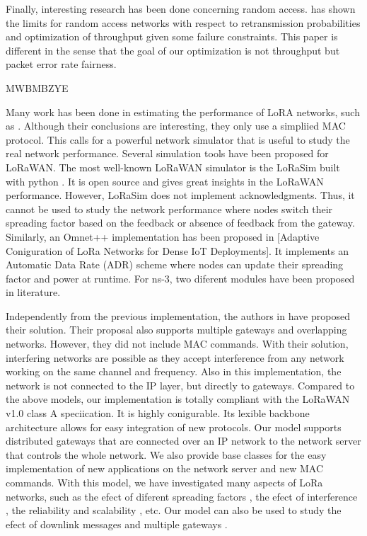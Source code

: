 Finally,
	interesting research has been done concerning random access.
\cite{dhillon_fundamentals_2014} has shown the limits for random access networks with respect to retransmission probabilities and optimization of throughput given some failure constraints.
This paper is different in the sense that the goal of our optimization is not throughput but packet error rate fairness.

\cite{reynders_lorawan_2018} MWBMBZYE


Many work has been done in estimating the performance of LoRA networks,
	such as \cite{adelantado_understanding_2017} \cite{augustin_study_2016} \cite{mikhaylov_analysis_2016}.
Although their conclusions are interesting,
	they only use a simpliied MAC protocol.
This calls for a powerful network simulator that is useful to study the real network performance.
Several simulation tools have been proposed for LoRaWAN.
The most well-known LoRaWAN simulator is the LoRaSim built with python \cite{bor_lora_2016} \cite{voigt_mitigating_2016}.
It is open source and gives great insights in the LoRaWAN performance.
However,
	LoRaSim does not implement acknowledgments.
Thus,
	it cannot be used to study the network performance where nodes switch their spreading factor based on the feedback or absence of feedback from the gateway.
Similarly,
	an Omnet++ implementation has been proposed in [Adaptive Coniguration of LoRa Networks for Dense IoT Deployments].
It implements an Automatic Data Rate (ADR) scheme where nodes can update their spreading factor and power at runtime.
For ns-3,
	two diferent modules have been proposed in literature.


Independently from the previous implementation,
	the authors in \cite{abeele_scalability_2017} have proposed their solution.
Their proposal also supports multiple gateways and overlapping networks.
However,
	they did not include MAC commands.
With their solution,
	interfering networks are possible as they accept interference from any network working on the same channel and frequency.
Also in this implementation,
	the network is not connected to the IP layer,
	but directly to gateways.
Compared to the above models,
	our implementation is totally compliant with the LoRaWAN v1.0 class A speciication.
It is highly conigurable.
Its lexible backbone architecture allows for easy integration of new protocols.
Our model supports distributed gateways that are connected over an IP network to the network server that controls the whole network.
We also provide base classes for the easy implementation of new applications on the network server and new MAC commands.
With this model,
	we have investigated many aspects of LoRa networks,
	such as the efect of diferent spreading factors \cite{reynders_power_2017},
	the efect of interference \cite{reynders_range_2016},
	the reliability and scalability \cite{reynders_improving_2018},
	etc.
Our model can also be used to study the efect of downlink messages \cite{pop_does_2017} and multiple gateways \cite{abeele_scalability_2017} \cite{voigt_mitigating_2016}.


